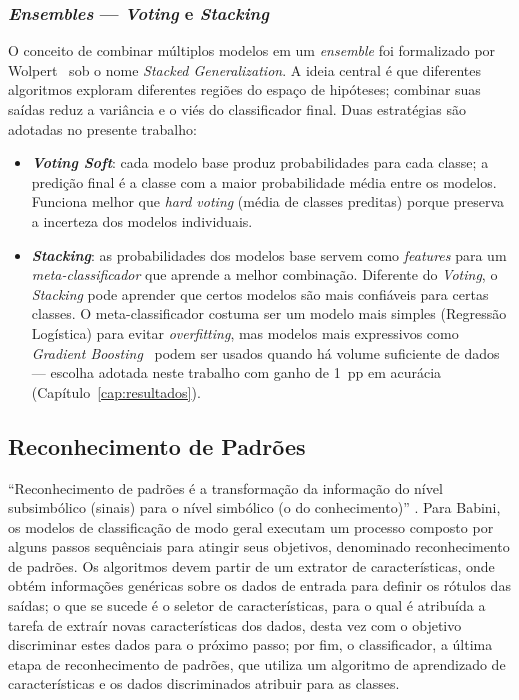 \subsubsection{\emph{Ensembles} --- \emph{Voting} e \emph{Stacking}}
\label{subsec:fund_ensembles}

O conceito de combinar múltiplos modelos em um \emph{ensemble} foi formalizado por Wolpert~\cite{wolpert1992stacked} sob o nome \emph{Stacked Generalization}. A ideia central é que diferentes algoritmos exploram diferentes regiões do espaço de hipóteses; combinar suas saídas reduz a variância e o viés do classificador final. Duas estratégias são adotadas no presente trabalho:

\begin{itemize}
  \item \textbf{\emph{Voting Soft}}: cada modelo base produz probabilidades para cada classe; a predição final é a classe com a maior probabilidade média entre os modelos. Funciona melhor que \emph{hard voting} (média de classes preditas) porque preserva a incerteza dos modelos individuais.
  \item \textbf{\emph{Stacking}}: as probabilidades dos modelos base servem como \emph{features} para um \emph{meta-classificador} que aprende a melhor combinação. Diferente do \emph{Voting}, o \emph{Stacking} pode aprender que certos modelos são mais confiáveis para certas classes. O meta-classificador costuma ser um modelo mais simples (Regressão Logística) para evitar \emph{overfitting}, mas modelos mais expressivos como \emph{Gradient Boosting}~\cite{friedman2001greedy} podem ser usados quando há volume suficiente de dados --- escolha adotada neste trabalho com ganho de 1~pp em acurácia (Capítulo~\ref{cap:resultados}).
\end{itemize}

\subsection{Reconhecimento de Padrões}

``Reconhecimento de padrões é a transformação da informação do nível subsimbólico (sinais) para o nível simbólico (o do conhecimento)'' \cite[p.15]{Babini07}. Para Babini, os modelos de classificação de modo geral executam um processo composto por alguns passos sequênciais para atingir seus objetivos, denominado reconhecimento de padrões. Os algoritmos devem partir de um extrator de características, onde obtém informações genéricas sobre os dados de entrada para definir os rótulos das saídas; o que se sucede é o seletor de características, para o qual é atribuída a tarefa de extraír novas características dos dados, desta vez com o objetivo discriminar estes dados para o próximo passo; por fim, o classificador, a última etapa de reconhecimento de padrões, que utiliza um algoritmo de aprendizado de  características e os dados discriminados atribuir para as classes.

